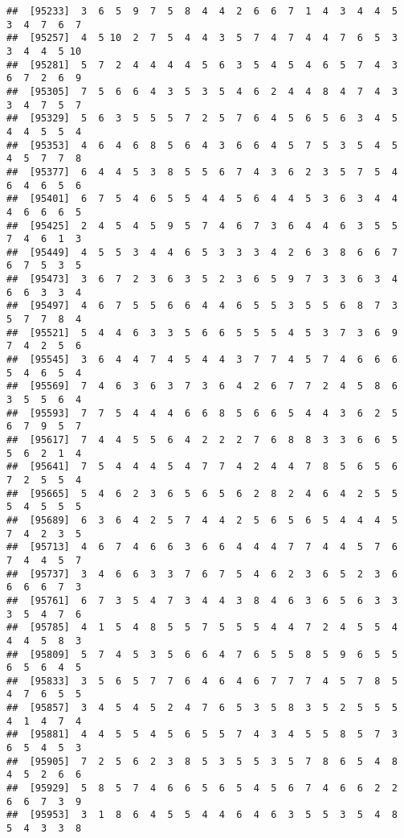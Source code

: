 \documentclass[
]{book}
\begin{document}
\begin{verbatim}
##  [95233]  3  6  5  9  7  5  8  4  4  2  6  6  7  1  4  3  4  4  5  3  4  7  6  7
##  [95257]  4  5 10  2  7  5  4  4  3  5  7  4  7  4  4  7  6  5  3  3  4  4  5 10
##  [95281]  5  7  2  4  4  4  4  5  6  3  5  4  5  4  6  5  7  4  3  6  7  2  6  9
##  [95305]  7  5  6  6  4  3  5  3  5  4  6  2  4  4  8  4  7  4  3  3  4  7  5  7
##  [95329]  5  6  3  5  5  5  7  2  5  7  6  4  5  6  5  6  3  4  5  4  4  5  5  4
##  [95353]  4  6  4  6  8  5  6  4  3  6  6  4  5  7  5  3  5  4  5  4  5  7  7  8
##  [95377]  6  4  4  5  3  8  5  5  6  7  4  3  6  2  3  5  7  5  4  6  4  6  5  6
##  [95401]  6  7  5  4  6  5  5  4  4  5  6  4  4  5  3  6  3  4  4  4  6  6  6  5
##  [95425]  2  4  5  4  5  9  5  7  4  6  7  3  6  4  4  6  3  5  5  7  4  6  1  3
##  [95449]  4  5  5  3  4  4  6  5  3  3  3  4  2  6  3  8  6  6  7  6  7  5  3  5
##  [95473]  3  6  7  2  3  6  3  5  2  3  6  5  9  7  3  3  6  3  4  6  6  3  3  4
##  [95497]  4  6  7  5  5  6  6  4  4  6  5  5  3  5  5  6  8  7  3  5  7  7  8  4
##  [95521]  5  4  4  6  3  3  5  6  6  5  5  5  4  5  3  7  3  6  9  7  4  2  5  6
##  [95545]  3  6  4  4  7  4  5  4  4  3  7  7  4  5  7  4  6  6  6  5  4  6  5  4
##  [95569]  7  4  6  3  6  3  7  3  6  4  2  6  7  7  2  4  5  8  6  3  5  5  6  4
##  [95593]  7  7  5  4  4  4  6  6  8  5  6  6  5  4  4  3  6  2  5  6  7  9  5  7
##  [95617]  7  4  4  5  5  6  4  2  2  2  7  6  8  8  3  3  6  6  5  5  6  2  1  4
##  [95641]  7  5  4  4  4  5  4  7  7  4  2  4  4  7  8  5  6  5  6  7  2  5  5  4
##  [95665]  5  4  6  2  3  6  5  6  5  6  2  8  2  4  6  4  2  5  5  5  4  5  5  5
##  [95689]  6  3  6  4  2  5  7  4  4  2  5  6  5  6  5  4  4  4  5  7  4  2  3  5
##  [95713]  4  6  7  4  6  6  3  6  6  4  4  4  7  7  4  4  5  7  6  7  4  4  5  7
##  [95737]  3  4  6  6  3  3  7  6  7  5  4  6  2  3  6  5  2  3  6  6  6  6  7  3
##  [95761]  6  7  3  5  4  7  3  4  4  3  8  4  6  3  6  5  6  3  3  3  5  4  7  6
##  [95785]  4  1  5  4  8  5  5  7  5  5  5  4  4  7  2  4  5  5  4  4  4  5  8  3
##  [95809]  5  7  4  5  3  5  6  6  4  7  6  5  5  8  5  9  6  5  5  6  5  6  4  5
##  [95833]  3  5  6  5  7  7  6  4  6  4  6  7  7  7  4  5  7  8  5  4  7  6  5  5
##  [95857]  3  4  5  4  5  2  4  7  6  5  3  5  8  3  5  2  5  5  5  4  1  4  7  4
##  [95881]  4  4  5  5  4  5  6  5  5  7  4  3  4  5  5  8  5  7  3  6  5  4  5  3
##  [95905]  7  2  5  6  2  3  8  5  3  5  5  3  5  7  8  6  5  4  8  4  5  2  6  6
##  [95929]  5  8  5  7  4  6  6  5  6  5  4  5  6  7  4  6  6  2  2  6  6  7  3  9
##  [95953]  3  1  8  6  4  5  5  4  4  6  4  6  3  5  5  3  5  4  8  5  4  3  3  8

\end{verbatim}
\end{document}
